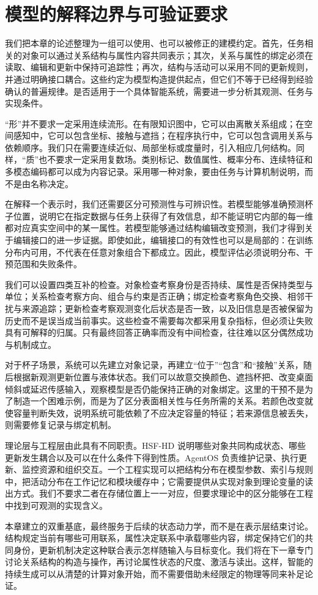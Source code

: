 \section{模型的解释边界与可验证要求}
\label{sec:axiom_system}

我们把本章的论述整理为一组可以使用、也可以被修正的建模约定。首先，任务相关的对象可以通过关系结构与属性内容共同表示；其次，关系与属性的绑定必须在读取、编辑和更新中保持可追踪性；再次，结构与活动可以采用不同的更新规则，并通过明确接口耦合。这些约定为模型构造提供起点，但它们不等于已经得到经验确认的普遍规律。是否适用于一个具体智能系统，需要进一步分析其观测、任务与实现条件。

“形”并不要求一定采用连续流形。在有限知识图中，它可以由离散关系组成；在空间感知中，它可以包含坐标、接触与遮挡；在程序执行中，它可以包含调用关系与依赖顺序。我们只在需要连续近似、局部坐标或度量时，引入相应几何结构。同样，“质”也不要求一定采用复数场。类别标记、数值属性、概率分布、连续特征和多模态编码都可以成为内容记录。采用哪一种对象，要由任务与计算机制说明，而不是由名称决定。

在解释一个表示时，我们还需要区分可预测性与可辨识性。若模型能够准确预测杯子位置，说明它在指定数据与任务上获得了有效信息，却不能证明它内部的每一维都对应真实空间中的某一属性。若模型能够通过结构编辑改变预测，我们才得到关于编辑接口的进一步证据。即使如此，编辑接口的有效性也可以是局部的：在训练分布内可用，不代表在任意对象组合下都成立。因此，模型评估必须说明分布、干预范围和失败条件。

我们可以设置四类互补的检查。对象检查考察身份是否持续、属性是否保持类型与单位；关系检查考察方向、组合与约束是否正确；绑定检查考察角色交换、相邻干扰与来源追踪；更新检查考察观测变化后状态是否一致，以及旧信息是否被保留为历史而不是误当成当前事实。这些检查不需要每次都采用复杂指标，但必须让失败具有可解释的归属。只有最终回答正确率而没有中间检查，往往难以区分偶然成功与机制成立。

对于杯子场景，系统可以先建立对象记录，再建立“位于”“包含”和“接触”关系，随后根据新观测更新位置与液体状态。我们可以故意交换颜色、遮挡杯把、改变桌面倾斜或延迟传感输入，观察模型是否仍能保持正确的对象绑定。这里的干预不是为了制造一个困难示例，而是为了区分表面相关性与任务所需的关系。若颜色改变就使容量判断失效，说明系统可能依赖了不应决定容量的特征；若来源信息被丢失，则需要修复记录与绑定机制。

理论层与工程层由此具有不同职责。HSF-HD 说明哪些对象共同构成状态、哪些更新发生耦合以及可以在什么条件下得到性质。AgentOS 负责维护记录、执行更新、监控资源和组织交互。一个工程实现可以把结构分布在模型参数、索引与规则中，把活动分布在工作记忆和模块缓存中；它需要提供从实现对象到理论变量的读出方式。我们不要求二者在存储位置上一一对应，但要求理论中的区分能够在工程中找到可观测的实现含义。

本章建立的双重基底，最终服务于后续的状态动力学，而不是在表示层结束讨论。结构规定当前有哪些可用联系，属性决定联系中承载哪些内容，绑定保持它们的共同身份，更新机制决定这种联合表示怎样随输入与目标变化。我们将在下一章专门讨论关系结构的构造与操作，再讨论属性状态的尺度、激活与读出。这样，智能的持续生成可以从清楚的计算对象开始，而不需要借助未经限定的物理等同来补足论证。
